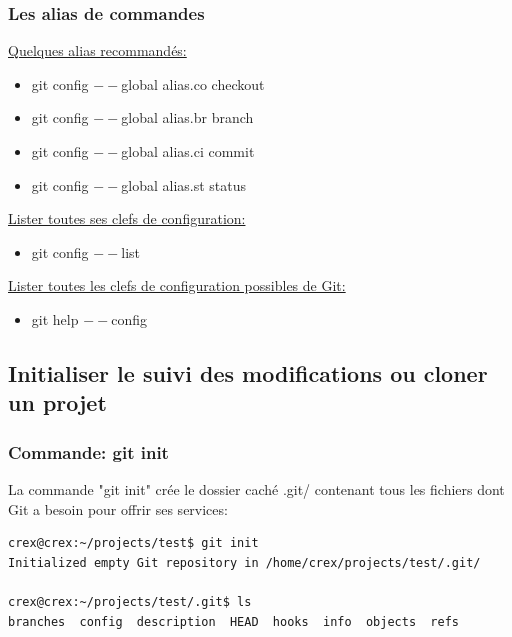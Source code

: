 \documentclass{beamer}
\begin{document}
\begin{frame}
\frametitle{Les alias de commandes}

\underline{Quelques alias recommandés:}
\begin{itemize} 
    \item[] git config $--$global alias.co checkout
    \item[] git config $--$global alias.br branch
    \item[] git config $--$global alias.ci commit
    \item[] git config $--$global alias.st status
\end{itemize}
\medskip

\underline{Lister toutes ses clefs de configuration:}
\begin{itemize}
    \item[] git config $--$list
\end{itemize}
\medskip

\underline{Lister toutes les clefs de configuration possibles de Git:}
\begin{itemize}
    \item[] git help $--$config
\end{itemize}
\end{frame}

\subsection{Initialiser le suivi des modifications ou cloner un projet}
\begin{frame}[fragile]
\frametitle{Commande: git init}
La commande "git init" crée le dossier caché .git/ contenant tous les fichiers dont Git a besoin pour offrir ses services:

    \begin{mdframed}[style=Bash]
    \begin{lstlisting}[style=Bash, caption={Contenu du dossier .git/}]
crex@crex:~/projects/test$ git init
Initialized empty Git repository in /home/crex/projects/test/.git/

crex@crex:~/projects/test/.git$ ls
branches  config  description  HEAD  hooks  info  objects  refs
    \end{lstlisting}
    \end{mdframed}
\end{frame}



\end{document}
